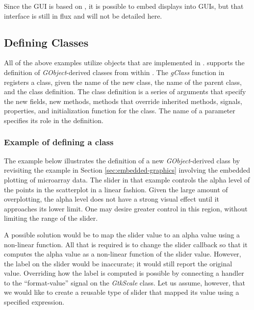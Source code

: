 \documentclass[article]{jss}
\begin{document}
Since the  GUI is based on , it is possible to
embed 
 displays into  GUIs, but that interface is
still in flux
and will not be detailed here.

\subsection[Defining GObject Classes]{Defining  Classes}

All of the above examples utilize objects that are implemented in
.
 supports the definition of \emph{GObject}-derived classes
from within
.  The \emph{gClass} function in  registers a 
class, given the name of the new class, the name of the parent class,
and the class 
definition. The class definition is a series of arguments that specify the new fields, new methods, 
methods that override inherited methods,
 signals, properties, and
initialization function
for the class. The name of a parameter specifies its role in the
definition.

\subsubsection{Example of defining a class}
\label{sec:class-example}

The example below illustrates the definition of a new
\emph{GObject}-derived
class by revisiting the example in Section \ref{sec:embedded-graphics} involving the embedded plotting of 
microarray data.
The slider in that example controls the alpha level of the
points in the scatterplot in a linear fashion. Given the large amount
of
overplotting, the alpha level does not have a strong visual effect
until it
approaches its lower limit. One may desire greater control in this
region,
without limiting the range of the slider. 

A possible solution would be to map the slider value to an alpha value
using a non-linear function. All that is required is to change the
slider callback so that it computes the alpha value as a non-linear
function of the slider value. However, the label on the slider would
be inaccurate; it would still report the original value.  Overriding
how the label is computed is possible by connecting a handler
to the
``format-value'' signal on the \emph{GtkScale} class. Let us assume,
however, that we would like to create a reusable type of slider that
mapped its value using a specified  expression.
\end{document}
